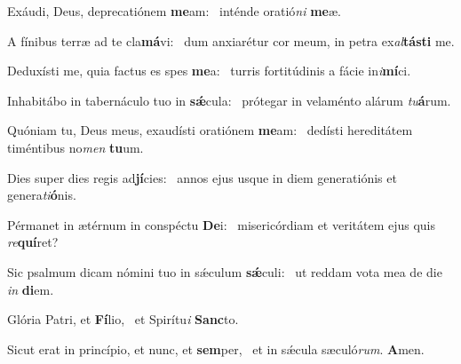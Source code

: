\item Exáudi, Deus, deprecatiónem \textbf{me}am:~\psstar{} inténde oratió\textit{ni} \textbf{me}æ.

\item A fínibus terræ ad te cla\textbf{má}vi:~\psstar{} dum anxiarétur cor meum, in petra ex\textit{al}\textbf{tás}\textbf{ti} me.

\item Deduxísti me, quia factus es spes \textbf{me}a:~\psstar{} turris fortitúdinis a fácie in\textit{i}\textbf{mí}ci.

\item Inhabitábo in tabernáculo tuo in \textbf{sǽ}cula:~\psstar{} prótegar in velaménto alárum \textit{tu}\textbf{á}rum.

\item Quóniam tu, Deus meus, exaudísti oratiónem \textbf{me}am:~\psstar{} dedísti hereditátem timéntibus no\textit{men} \textbf{tu}um.

\item Dies super dies regis ad\textbf{jí}cies:~\psstar{} annos ejus usque in diem generatiónis et genera\textit{ti}\textbf{ó}nis.

\item Pérmanet in ætérnum in conspéctu \textbf{De}i:~\psstar{} misericórdiam et veritátem ejus quis \textit{re}\textbf{quí}ret?

\item Sic psalmum dicam nómini tuo in sǽculum \textbf{sǽ}culi:~\psstar{} ut reddam vota mea de die \textit{in} \textbf{di}em.

\item Glória Patri, et \textbf{Fí}lio,~\psstar{} et Spirítu\textit{i} \textbf{Sanc}to.

\item Sicut erat in princípio, et nunc, et \textbf{sem}per,~\psstar{} et in sǽcula sæculó\textit{rum}. \textbf{A}men.
